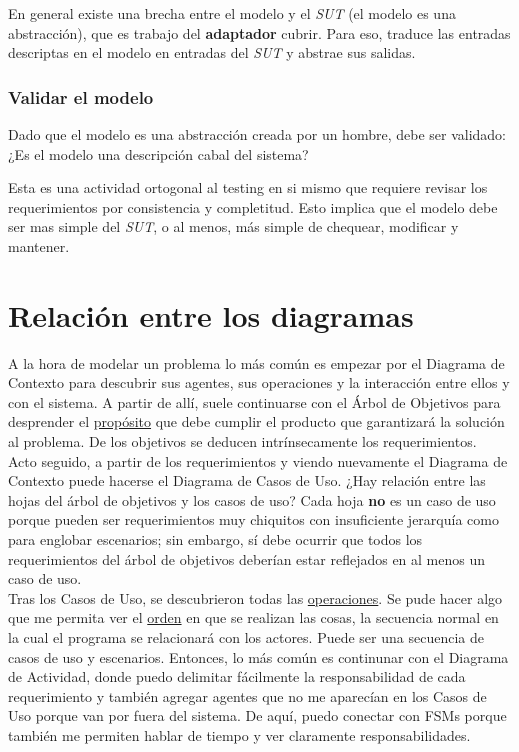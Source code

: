\documentclass[]{article}
\begin{document}
En general existe una brecha entre el modelo y el \textit{SUT} (el modelo es una abstracción), que es trabajo del \textbf{adaptador} cubrir. Para eso, traduce las entradas descriptas en el modelo en entradas del \textit{SUT} y abstrae sus salidas.

\subsubsection{Validar el modelo}
Dado que el modelo es una abstracción creada por un hombre, debe ser validado: ¿Es el modelo una descripción cabal del sistema?

Esta es una actividad ortogonal al testing en si mismo que requiere revisar los requerimientos por consistencia y completitud. Esto implica que el modelo debe ser mas simple del \textit{SUT}, o al menos, más simple de chequear, modificar y mantener.


\newpage
\section{Relación entre los diagramas}
A la hora de modelar un problema lo más común es empezar por el Diagrama de Contexto para descubrir sus agentes, sus operaciones y la interacción entre ellos y con el sistema. A partir de allí, suele continuarse con el Árbol de Objetivos para desprender el \underline{propósito} que debe cumplir el producto que garantizará la solución al problema. De los objetivos se deducen intrínsecamente los requerimientos.\\

Acto seguido, a partir de los requerimientos y viendo nuevamente el Diagrama de Contexto puede hacerse el Diagrama de Casos de Uso. ¿Hay relación entre las hojas del árbol de objetivos y los casos de uso? Cada hoja \textbf{no} es un caso de uso porque pueden ser requerimientos muy chiquitos con insuficiente jerarquía como para englobar escenarios; sin embargo, sí debe ocurrir que todos los requerimientos del árbol de objetivos deberían estar reflejados en al menos un caso de uso.\\

Tras los Casos de Uso, se descubrieron todas las \underline{operaciones}. Se pude hacer algo que me permita ver el \underline{orden} en que se realizan las cosas, la secuencia normal en la cual el programa se relacionará con los actores. Puede ser una secuencia de casos de uso y escenarios. Entonces, lo más común es continunar con el Diagrama de Actividad, donde puedo delimitar fácilmente la responsabilidad de cada requerimiento y también agregar agentes que no me aparecían en los Casos de Uso porque van por fuera del sistema. De aquí, puedo conectar con FSMs porque también me permiten hablar de tiempo y ver claramente responsabilidades.\\
\end{document}
